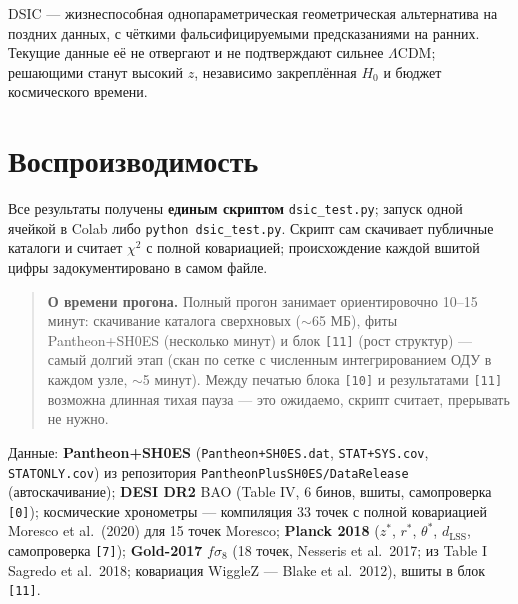 \documentclass{article}
\begin{document}
DSIC --- жизнеспособная однопараметрическая геометрическая альтернатива на поздних данных, с чёткими фальсифицируемыми предсказаниями на ранних. Текущие данные её не отвергают и не подтверждают сильнее $\Lambda$CDM; решающими станут высокий $z$, независимо закреплённая $H_0$ и бюджет космического времени.

\section{Воспроизводимость}

Все результаты получены \textbf{единым скриптом} \texttt{dsic\_test.py}; запуск одной ячейкой в Colab либо \texttt{python dsic\_test.py}. Скрипт сам скачивает публичные каталоги и считает $\chi^2$ с полной ковариацией; происхождение каждой вшитой цифры задокументировано в самом файле.

\begin{quote}
\textbf{О времени прогона.} Полный прогон занимает ориентировочно 10--15 минут: скачивание каталога сверхновых ($\sim$65 МБ), фиты Pantheon+SH0ES (несколько минут) и блок \texttt{[11]} (рост структур) --- самый долгий этап (скан по сетке с численным интегрированием ОДУ в каждом узле, $\sim$5 минут). Между печатью блока \texttt{[10]} и результатами \texttt{[11]} возможна длинная тихая пауза --- это ожидаемо, скрипт считает, прерывать не нужно.
\end{quote}

Данные: \textbf{Pantheon+SH0ES} (\texttt{Pantheon+SH0ES.dat}, \texttt{STAT+SYS.cov}, \texttt{STATONLY.cov}) из репозитория \texttt{PantheonPlusSH0ES/DataRelease} (автоскачивание); \textbf{DESI DR2} BAO (Table IV, 6 бинов, вшиты, самопроверка \texttt{[0]}); космические хронометры --- компиляция 33 точек с полной ковариацией Moresco et al.\ (2020) для 15 точек Moresco; \textbf{Planck 2018} ($z^*$, $r^*$, $\theta^*$, $d_{\text{LSS}}$, самопроверка \texttt{[7]}); \textbf{Gold-2017} $f\sigma_8$ (18 точек, Nesseris et al.\ 2017; из Table I Sagredo et al.\ 2018; ковариация WiggleZ --- Blake et al.\ 2012), вшиты в блок \texttt{[11]}.
\end{document}
